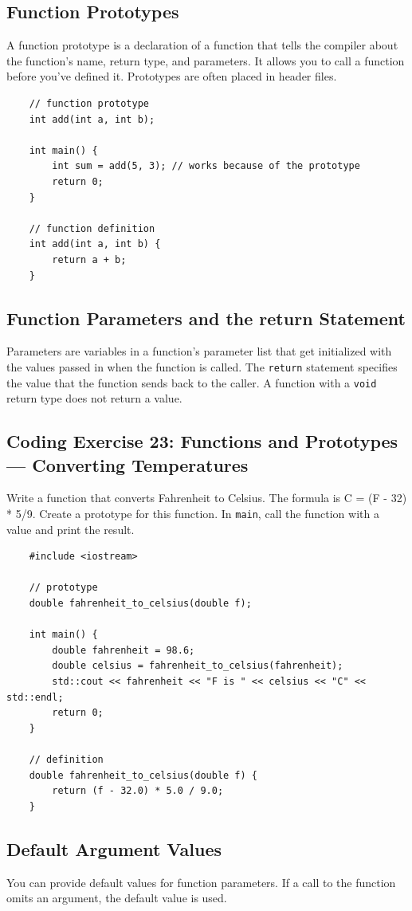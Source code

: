 \subsection{Function Prototypes}
A function prototype is a declaration of a function that tells the compiler about the function's name, return type, and parameters. It allows you to call a function before you've defined it. Prototypes are often placed in header files.
\begin{lstlisting}
	// function prototype
	int add(int a, int b);

	int main() {
		int sum = add(5, 3); // works because of the prototype
		return 0;
	}

	// function definition
	int add(int a, int b) {
		return a + b;
	}
\end{lstlisting}

\subsection{Function Parameters and the return Statement}
Parameters are variables in a function's parameter list that get initialized with the values passed in when the function is called. The \texttt{return} statement specifies the value that the function sends back to the caller. A function with a \texttt{void} return type does not return a value.

\subsection{Coding Exercise 23: Functions and Prototypes --- Converting Temperatures}
Write a function that converts Fahrenheit to Celsius. The formula is C = (F - 32) * 5/9. Create a prototype for this function. In \texttt{main}, call the function with a value and print the result.
\begin{lstlisting}
	#include <iostream>

	// prototype
	double fahrenheit_to_celsius(double f);

	int main() {
		double fahrenheit = 98.6;
		double celsius = fahrenheit_to_celsius(fahrenheit);
		std::cout << fahrenheit << "F is " << celsius << "C" << std::endl;
		return 0;
	}

	// definition
	double fahrenheit_to_celsius(double f) {
		return (f - 32.0) * 5.0 / 9.0;
	}
\end{lstlisting}

\subsection{Default Argument Values}
You can provide default values for function parameters. If a call to the function omits an argument, the default value is used.

